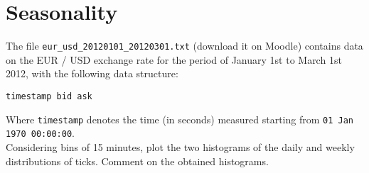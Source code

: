 \section{Seasonality}
The file \texttt{eur\_usd\_20120101\_20120301.txt} (download it on Moodle) contains data on the EUR / USD exchange rate for the period of January 1st to March 1st 2012, with the following data structure:
\begin{verbatim}
timestamp bid ask
\end{verbatim}

\noindent Where \texttt{timestamp} denotes the time (in seconds) measured starting from \texttt{01 Jan 1970 00:00:00}. \\
\noindent Considering bins of 15 minutes, plot the two histograms of the daily and weekly distributions of ticks. Comment on the obtained histograms.

